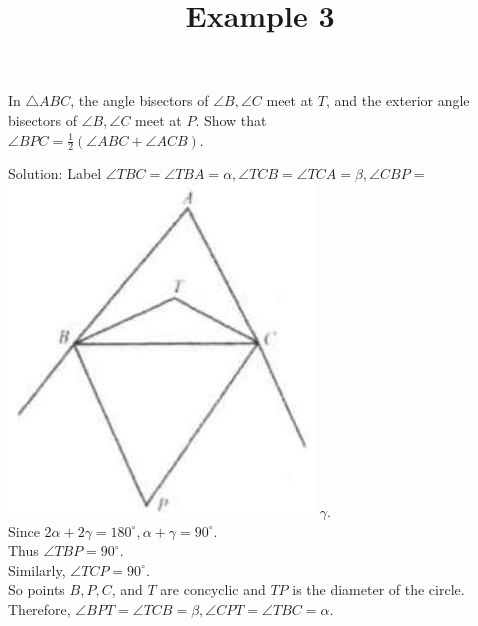 \documentclass{article}
\title{Example 3}
\date{}
\begin{document}
\maketitle

In \(\triangle A B C\), the angle bisectors of \(\angle B, \angle C\) meet at \(T\), and the exterior angle bisectors of \(\angle B, \angle C\) meet at \(P\). Show that\\
\(\angle B P C=\frac{1}{2}(\angle A B C+\angle A C B)\).

Solution:
Label \(\angle T B C=\angle T B A=\alpha, \angle T C B=\angle T C A=\beta, \angle C B P=\)\\
\includegraphics[width=\textwidth]{images/problem_image_1.jpg} \(\gamma\).\\
Since \(2 \alpha+2 \gamma=180^{\circ}, \alpha+\gamma=90^{\circ}\).\\
Thus \(\angle T B P=90^{\circ}\).\\
Similarly, \(\angle T C P=90^{\circ}\).\\
So points \(B, P, C\), and \(T\) are concyclic and \(T P\) is the diameter of the circle.\\
Therefore, \(\angle B P T=\angle T C B=\beta, \angle C P T=\angle T B C=\alpha\).\\
\end{document}
